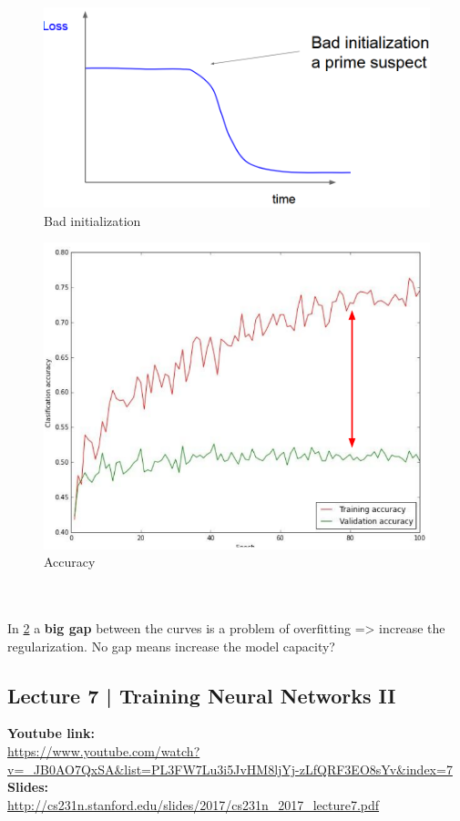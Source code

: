 \documentclass[11pt]{article}
\begin{document}
\begin{minipage}{0.5\textwidth}
\begin{figure} [H]
\centering 
\includegraphics[scale=0.52]{L515.pdf}
\caption{ Bad initialization}
\label{fig:L515}
\end{figure}

\begin{figure} [H]
\centering 
\includegraphics[scale=0.58]{L516.pdf}
\caption{ Accuracy}
\label{fig:L516}
\end{figure}

\end{minipage}\\\\
In \ref{fig:L516} a \textbf{big gap} between the curves is a problem of overfitting => increase the regularization. No gap means increase the model capacity?
\clearpage
\subsection{Lecture 7 | Training Neural Networks II}
\textbf{Youtube link:}\\
\url{https://www.youtube.com/watch?v=_JB0AO7QxSA&list=PL3FW7Lu3i5JvHM8ljYj-zLfQRF3EO8sYv&index=7}\\
\textbf{Slides:}\\
\url{http://cs231n.stanford.edu/slides/2017/cs231n_2017_lecture7.pdf}
\end{document}
